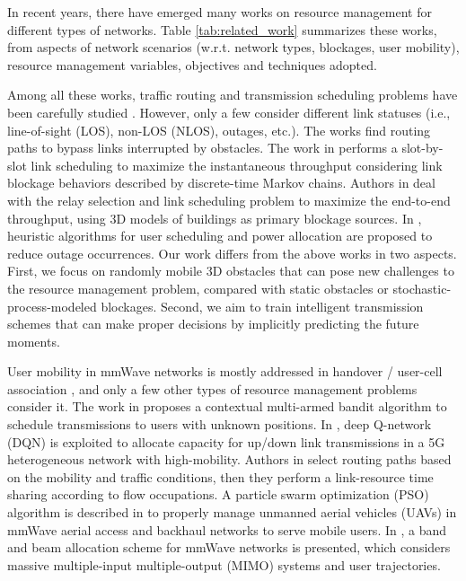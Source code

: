 In recent years, there have emerged many works on resource management for different types of networks. Table \ref{tab:related_work} summarizes these works, from aspects of network scenarios (w.r.t. network types, blockages, user mobility), resource management variables, objectives and techniques adopted.

Among all these works, traffic routing and transmission scheduling problems have been carefully studied
\cite{polese2018distributed, kilpi2017link,saad2019millimeter}.
However, only a few consider different link statuses (i.e., line-of-sight (LOS), non-LOS (NLOS), outages, etc.).
The works \cite{garcia2018delay,niu2019relay} find routing paths to bypass links interrupted by obstacles.
The work in \cite{he2015minimum} performs a slot-by-slot link scheduling to maximize the instantaneous throughput considering link blockage behaviors described by discrete-time Markov chains.
Authors in \cite{hu2017relay} deal with the relay selection and link scheduling problem to maximize the end-to-end throughput, using 3D models of buildings as primary blockage sources.
In \cite{yao2017outage}, heuristic algorithms for user scheduling and power allocation are proposed to reduce outage occurrences.
Our work differs from the above works in two aspects. First, we focus on randomly mobile 3D obstacles that can pose new challenges to the resource management problem, compared with static obstacles or stochastic-process-modeled blockages. Second, we aim to train intelligent transmission schemes that can make proper decisions by implicitly predicting the future moments.

User mobility in mmWave networks is mostly addressed in handover / user-cell association \cite{khan2019reinforcement,khosravi2020learning}, and only a few other types of resource management problems consider it.
The work in \cite{kim2019online} proposes a contextual multi-armed bandit algorithm to schedule transmissions to users with unknown positions.
In \cite{tang2020deep}, deep Q-network (DQN) is exploited to allocate capacity for up/down link transmissions in a 5G heterogeneous network with high-mobility.
Authors in \cite{pateromichelakis2018context} select routing paths based on the mobility and traffic conditions, then they perform a link-resource time sharing according to flow occupations.
A particle swarm optimization (PSO) algorithm is described in \cite{tafintsev2020aerial} to properly manage unmanned aerial vehicles (UAVs) in mmWave aerial access and backhaul networks to serve mobile users.
In \cite{shen2020mobility}, a band and beam allocation scheme for mmWave networks is presented, which considers massive multiple-input multiple-output (MIMO) systems and user trajectories.

